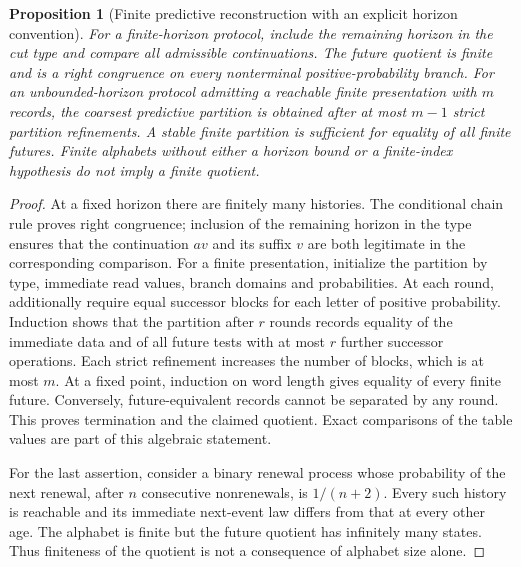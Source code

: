 \documentclass[11pt]{article}
\numberwithin{equation}{section}
\newtheorem{proposition}[proposition]{Proposition}
\theoremstyle{definition}
\theoremstyle{remark}
\begin{document}
\begin{proposition}[Finite predictive reconstruction with an explicit horizon convention]
\label{prop:supp-finite-prediction}
For a finite-horizon protocol, include the remaining horizon in the cut type
and compare all admissible continuations. The future quotient is finite and
is a right congruence on every nonterminal positive-probability branch.
For an unbounded-horizon protocol admitting a reachable finite presentation
with $m$ records, the coarsest predictive partition is obtained after at most
$m-1$ strict partition refinements. A stable finite partition is sufficient
for equality of all finite futures. Finite alphabets without either a horizon
bound or a finite-index hypothesis do not imply a finite quotient.
\end{proposition}
\begin{proof}
At a fixed horizon there are finitely many histories. The conditional chain
rule proves right congruence; inclusion of the remaining horizon in the type
ensures that the continuation $av$ and its suffix $v$ are both legitimate in
the corresponding comparison. For a finite presentation, initialize the
partition by type, immediate read values, branch domains and probabilities.
At each round, additionally require equal successor blocks for each letter
of positive probability. Induction shows that the partition after $r$ rounds
records equality of the immediate data and of all future tests with at most
$r$ further successor operations. Each strict refinement increases the
number of blocks, which is at most $m$. At a fixed point, induction on word
length gives equality of every finite future. Conversely, future-equivalent
records cannot be separated by any round. This proves termination and the
claimed quotient. Exact comparisons of the table values are part of this
algebraic statement.

For the last assertion, consider a binary renewal process whose probability
of the next renewal, after $n$ consecutive nonrenewals, is $1/(n+2)$.
Every such history is reachable and its immediate next-event law differs
from that at every other age. The alphabet is finite but the future quotient
has infinitely many states. Thus finiteness of the quotient is not a
consequence of alphabet size alone.
\end{proof}
\end{document}
